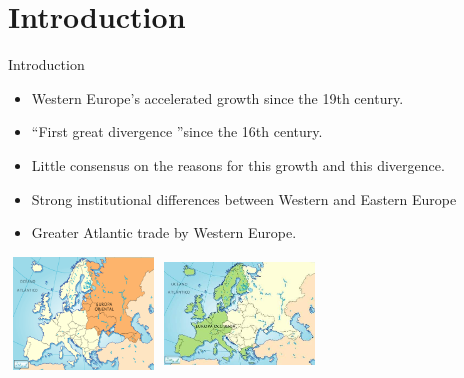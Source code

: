 \documentclass[pdftex,12pt,xcolor=pdftex,table]{beamer}
\theoremstyle{definition}
\theoremstyle{remark}
\numberwithin{equation}{section}
\numberwithin{figure}{section}
\begin{document}
	
	\section{Introduction}
		\begin{frame}{Introduction}
			\justifying
			\begin{itemize}
			    \item Western Europe's accelerated growth since the 19th century.
			    \item “First great divergence ”since the 16th century.
			    \item Little consensus on the reasons for this growth and this divergence. 
			    \item Strong institutional differences between Western and Eastern Europe
			    \item Greater Atlantic trade by Western Europe.
			\end{itemize}
			\vspace{6mm} 
			\centering
			\includegraphics[width=4cm, height=3cm]{pp4.png}
			\includegraphics[width=4cm, height=3cm]{pp5.jpg}
		\end{frame}
		
	
\end{document}
